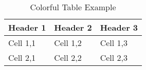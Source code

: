 \documentclass{article}
\begin{document}
\begin{table}
\centering
{}
\begin{tabular}{lll}
\toprule
\textbf{Header 1} & \textbf{Header 2} & \textbf{Header 3} \\
\midrule
Cell 1,1 & Cell 1,2 & Cell 1,3 \\
Cell 2,1 & Cell 2,2 & Cell 2,3 \\
\bottomrule
\end{tabular}
\caption{Colorful Table Example}
\end{table}
\end{document}
